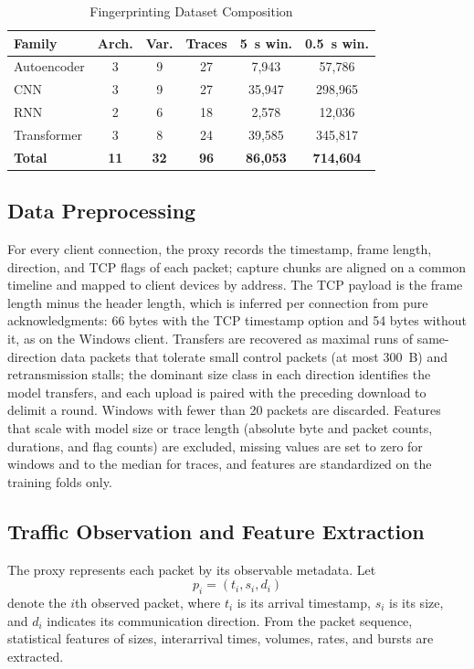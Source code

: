 \documentclass[conference]{IEEEtran}
\begin{document}
\begin{table}[!htbp]
\centering
\caption{Fingerprinting Dataset Composition}
\label{tab:fp_dataset}
\scriptsize
\renewcommand{\arraystretch}{1.05}
\setlength{\tabcolsep}{4pt}
\begin{tabular}{lccccc}
\hline
\textbf{Family} & \textbf{Arch.} & \textbf{Var.} & \textbf{Traces} &
\textbf{5~s win.} & \textbf{0.5~s win.} \\
\hline
Autoencoder & 3  & 9  & 27 & 7{,}943  & 57{,}786 \\
CNN         & 3  & 9  & 27 & 35{,}947 & 298{,}965 \\
RNN         & 2  & 6  & 18 & 2{,}578  & 12{,}036 \\
Transformer & 3  & 8  & 24 & 39{,}585 & 345{,}817 \\
\hline
\textbf{Total} & \textbf{11} & \textbf{32} & \textbf{96} & \textbf{86{,}053} & \textbf{714{,}604} \\
\hline
\end{tabular}
\end{table}

\subsection{Data Preprocessing}
\label{subsec:preprocessing}
For every client connection, the proxy records the timestamp, frame length,
direction, and TCP flags of each packet; capture chunks are aligned on a common
timeline and mapped to client devices by address. The TCP payload is the frame
length minus the header length, which is inferred per connection from pure
acknowledgments: 66 bytes with the TCP timestamp option and 54 bytes without it,
as on the Windows client. Transfers are recovered as maximal runs of
same-direction data packets that tolerate small control packets (at most
300~B) and retransmission stalls; the dominant size class in each direction
identifies the model transfers, and each upload is paired with the preceding
download to delimit a round. Windows with fewer than 20 packets are discarded.
Features that scale with model size or trace length (absolute byte and packet
counts, durations, and flag counts) are excluded, missing values are set to zero
for windows and to the median for traces, and features are standardized on the
training folds only.

\subsection{Traffic Observation and Feature Extraction}
The proxy represents each packet by its observable metadata. Let
\begin{equation}
p_i = (t_i, s_i, d_i)
\label{eq:packet}
\end{equation}
denote the $i$th observed packet, where $t_i$ is its arrival timestamp, $s_i$ is
its size, and $d_i$ indicates its communication direction. From the packet
sequence, statistical features of sizes, interarrival times, volumes, rates, and
bursts are extracted.
\end{document}
